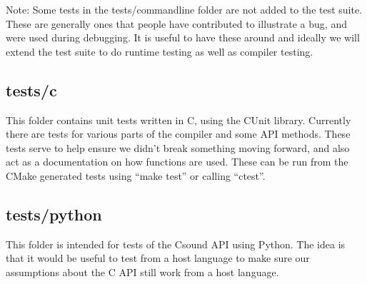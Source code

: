 \documentclass[]{book}
\begin{document}
Note: Some tests in the tests/commandline folder are not added to the
test suite. These are generally ones that people have contributed to
illustrate a bug, and were used during debugging. It is useful to have
these around and ideally we will extend the test suite to do runtime
testing as well as compiler testing.

\subsection{tests/c}

This folder contains unit tests written in C, using the CUnit library.
Currently there are tests for various parts of the compiler and some API
methods. These tests serve to help ensure we didn't break something
moving forward, and also act as a documentation on how functions are
used. These can be run from the CMake generated tests using ``make
test'' or calling ``ctest''.

\subsection{tests/python}

This folder is intended for tests of the Csound API using Python. The
idea is that it would be useful to test from a host language to make
sure our assumptions about the C API still work from a host language.
\end{document}
